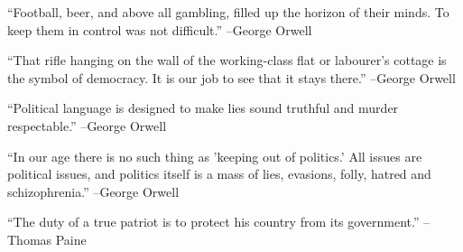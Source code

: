 \documentclass{article}%
\begin{document}
\linebreak%
\vspace{1mm}%
\begin{minipage}{\textwidth}%
\flushleft%
“Football, beer, and above all gambling, filled up the horizon of their minds. To keep them in control was not difficult.”%
\linebreak%
\vspace{1mm}%
–George Orwell%
\linebreak%
\vspace{1mm}%
\end{minipage}%
\linebreak%
\vspace{1mm}%
\begin{minipage}{\textwidth}%
\flushleft%
“That rifle hanging on the wall of the working{-}class flat or labourer's cottage is the symbol of democracy. It is our job to see that it stays there.”%
\linebreak%
\vspace{1mm}%
–George Orwell%
\linebreak%
\vspace{1mm}%
\end{minipage}%
\linebreak%
\vspace{1mm}%
\begin{minipage}{\textwidth}%
\flushleft%
“Political language is designed to make lies sound truthful and murder respectable.”%
\linebreak%
\vspace{1mm}%
–George Orwell%
\linebreak%
\vspace{1mm}%
\end{minipage}%
\linebreak%
\vspace{1mm}%
\begin{minipage}{\textwidth}%
\flushleft%
“In our age there is no such thing as 'keeping out of politics.' All issues are political issues, and politics itself is a mass of lies, evasions, folly, hatred and schizophrenia.”%
\linebreak%
\vspace{1mm}%
–George Orwell%
\linebreak%
\vspace{1mm}%
\end{minipage}%
\linebreak%
\vspace{1mm}%
\begin{minipage}{\textwidth}%
\flushleft%
“The duty of a true patriot is to protect his country from its government.”%
\linebreak%
\vspace{1mm}%
–Thomas Paine%
\linebreak%
\vspace{1mm}%
\end{minipage}%
\end{document}
